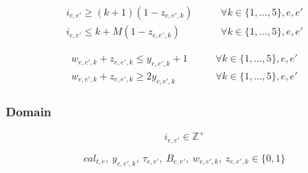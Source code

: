 \documentclass[11pt, a4paper, leqno]{article}
\begin{document}
	\begin{align*}
		i_{e,e'} \geq \left(k+1\right)\left(1-z_{e,e',k}\right) &\qquad\forall k \in \{1,\dots,5\},e,e'\\
		i_{e,e'} \leq k + M  (1-z_{e,e',k}) &\qquad\forall k \in \{1,\dots,5\},e,e'
	\end{align*}
	
	\begin{align*}
		w_{e,e',k} + z_{e,e',k} \leq y_{e,e',k} + 1 &\qquad\forall k \in \{1,\dots,5\},e,e'\\
		w_{e,e',k} + z_{e,e',k} \geq 2y_{e,e',k} &\qquad\forall k \in \{1,\dots,5\},e,e'
	\end{align*}
	
	\subsubsection{Domain}
	
	\[
		i_{e,e'} \in \mathbb{Z}^{+}
	\]
	
	\[
		cal_{t,e},\ y_{e,e',k},\ \tau_{e,e'},\ B_{e,e'},\ w_{e,e',k},\ z_{e,e',k} \in \{0,1\}
	\]
\end{document}
